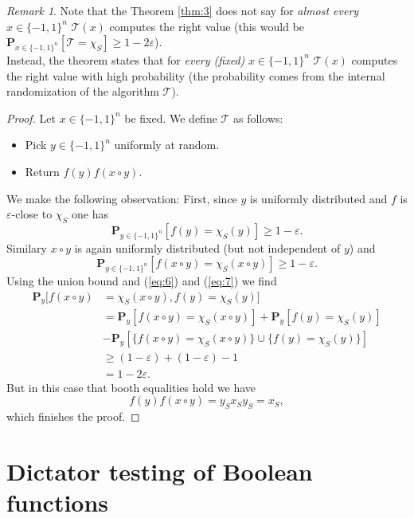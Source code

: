 \documentclass[a4paper]{article}
\newcommand{\prob}{\mathbf{P}}
\newcommand{\eps}{\varepsilon}
\theoremstyle{plain}
\theoremstyle{definition}
\theoremstyle{remark}
\newtheorem{remark}{Remark}
\begin{document}
\begin{remark}
Note that the Theorem \ref{thm:3} does not say for \emph{almost every}
\(x\in \{-1,1\}^n\) \(\mathcal{T}(x)\) computes the right value (this
would be \(\prob_{x \in \{-1,1\}^n}[\mathcal{T} = \chi_S] \geq 1 -
2\eps \)). \\
Instead, the theorem states that for \emph{every (fixed)} \(x\in
\{-1,1\}^n\) \(\mathcal{T}(x)\) computes the right value with high
probability (the probability comes from the internal randomization of
the algorithm \(\mathcal{T}\)). 
\end{remark}

\begin{proof}
  Let \(x\in \{-1,1\}^n\) be fixed. We define \(\mathcal{T}\) as
  follows: 
  \begin{itemize}
  \item Pick \(y\in\{-1,1\}^n\) uniformly at random.
  \item Return \(f(y)f(x\circ y)\). 
  \end{itemize}
  We make the following observation: First, since \(y\) is uniformly
  distributed and \(f\) is \(\eps\)-close to \(\chi_S\) one has
  \begin{equation}
    \label{eq:6}
    \prob_{y\in\{-1,1\}^n}[f(y) = \chi_S(y)] \geq 1 - \eps. 
  \end{equation}
  Similary \(x\circ y\) is again uniformly distributed (but not
  independent of \(y\)) and 
  \begin{equation}
    \label{eq:7}
    \prob_{y\in\{-1,1\}^n}[f(x\circ y) = \chi_S(x\circ y)] \geq 1 - \eps. 
  \end{equation}
  Using the union bound and (\ref{eq:6}) and (\ref{eq:7}) we find 
  \begin{align}
    \label{eq:8}
    \prob_{y}[f(x\circ y) &= \chi_S(x\circ y), f(y) = \chi_S(y)] \\
    &= \prob_{y}[f(x\circ y) = \chi_S(x\circ y)] + \prob_{y}[f(y) = \chi_S(y)] \\ 
    &- \prob_{y}[\{f(x\circ y) = \chi_S(x\circ y)\} \cup \{f(y) = \chi_S(y)\}] \\
    &\geq (1-\eps) + (1-\eps) - 1 \\
    &= 1-2\eps. 
  \end{align}
  But in this case that booth equalities hold we have 
  \[f(y)f(x\circ y) = y_Sx_Sy_S = x_S,\] 
  which finishes the proof. 
\end{proof}
\section{Dictator testing of Boolean functions}
\label{sec:dict-test-bool}
\end{document}
